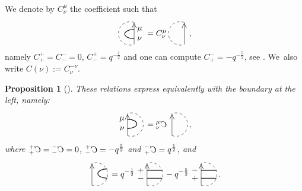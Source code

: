 \documentclass[11pt]{article}
\numberwithin{equation}{section}
\numberwithin{equation}{section}
\newtheorem{Proposition}[Theorem]{Proposition}
 { \theoremstyle{definition}
\newtheorem{Definition}[Theorem]{Definition}
\newtheorem{Note}[Theorem]{Note}
\newtheorem{Example}[Theorem]{Example}
\newtheorem{Remark}[Theorem]{Remark} }
\begin{document}
\begin{Definition}
We denote by $C^\mu_\nu$ the coefficient such that
\[
\begin{tikzpicture}[scale = 0.5, baseline = -3pt]
\draw[dashed] (70:1) arc(70:290:1);
\draw (-70:1) -- (70:1) node[pos = 0.85,sloped]{\small $>$};
\draw[thick] (70:1)++ (0,-0.6) node[right]{\small $\mu$} arc(90:270:0.8 and 0.4) node[right]{\small $\nu$};
\end{tikzpicture} = C^\mu_\nu \begin{tikzpicture}[scale = 0.5, baseline = -3pt]
\draw[dashed] (70:1) arc(70:290:1);
\draw (-70:1) -- (70:1) node[pos = 0.85,sloped]{\small $>$};
\end{tikzpicture},
\]
namely $C_+^+ = C_-^- = 0$, $C^+_-=q^{-\frac{1}{2}}$ and one can compute $C^-_+ = -q^{-\frac{5}{2}}$, see \cite[Lemma~2.3(13)]{Cos}. We~also write $C(\nu) := C_\nu^{-\nu}$.
\end{Definition}

\begin{Proposition}[{\cite[Lemmas 2.3 and 2.4]{TTQLe}}] \label{propLeftStSkRel}
These relations express equivalently with the boundary at the left, namely:
\[
\begin{tikzpicture}[scale = 0.5, baseline = -3pt, rotate = 180]
\draw[dashed] (70:1) arc(70:290:1);
\draw (-70:1) -- (70:1) node[pos = 0.15,sloped]{\small $>$};
\draw[thick] (70:1)++ (0,-0.6) node[left]{\small $\nu$} arc(90:270:0.8 and 0.4) node[left]{\small $\mu$};
\end{tikzpicture} = {}^{\mu}_{\nu}\reflectbox{$C$} \begin{tikzpicture}[scale = 0.5, baseline = -3pt, rotate = 180]
\draw[dashed] (70:1) arc(70:290:1);
\draw (-70:1) -- (70:1) node[pos = 0.15,sloped]{\small $>$};
\end{tikzpicture},
\]
where ${}^+_+ \reflectbox{$C$} = {}^-_-\reflectbox{$C$}=0$, ${}^+_-\reflectbox{$C$}= -q^{\frac{5}{2}}$ and ${}^-_+\reflectbox{$C$}= q^{\frac{1}{2}}$, and
\[
\begin{tikzpicture}[scale = 0.5, baseline = -3pt, rotate = 180]
\draw[dashed] (70:1) arc(70:290:1);
\draw (-70:1) -- (70:1) node[pos = 0.15,sloped]{\small $>$};
\draw[thick] (70:1)++ (-1.3,-0.6) arc(90:-90:0.8 and 0.4);
\end{tikzpicture} = q^{-\frac{1}{2}} \begin{tikzpicture}[scale = 0.5, baseline = -3pt, rotate = 180]
\draw[dashed] (70:1) arc(70:290:1);
\draw (-70:1) -- (70:1) node[pos = 0.15,sloped]{\small $>$};
\draw[thick] (70:1)++ (0,-0.6) node[left]{\small $-$} -- ++(-1.3,0);
\draw[thick] (-70:1)++ (0,0.6) node[left]{\small $+$} -- ++(-1.3,0);
\end{tikzpicture} -q^{-\frac{5}{2}} \begin{tikzpicture}[scale = 0.5, baseline = -3pt, rotate = 180]
\draw[dashed] (70:1) arc(70:290:1);
\draw (-70:1) -- (70:1) node[pos = 0.15,sloped]{\small $>$};
\draw[thick] (70:1)++ (0,-0.6) node[left]{\small $+$} -- ++(-1.3,0);
\draw[thick] (-70:1)++ (0,0.6) node[left]{\small $-$} -- ++(-1.3,0);
\end{tikzpicture}.
\]
\end{Proposition}
\end{document}
